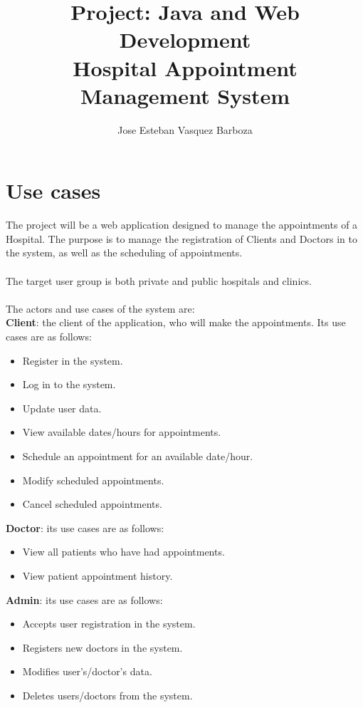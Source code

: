 \documentclass[11pt]{article}
\title{Project: Java and Web Development\\Hospital Appointment Management System}
\author{Jose Esteban Vasquez Barboza}
\begin{document}
    \maketitle

    \newpage

    \section{Use cases}

    The project will be a web application designed to manage the appointments of a Hospital. The purpose is to manage the registration of Clients and Doctors in to the system, as well as the scheduling of appointments.\\ \\
    The target user group is both private and public hospitals and clinics.\\ \\
    The actors and use cases of the system are: \\ 

\textbf{Client}: the client of the application, who will make the appointments. Its use cases are as follows:
    \begin{itemize}
        \item Register in the system.
        \item Log in to the system.
        \item Update user data.
        \item View available dates/hours for appointments.
        \item Schedule an appointment for an available date/hour.
        \item Modify scheduled appointments.
        \item Cancel scheduled appointments. \end{itemize}

\textbf{Doctor}:  its use cases are as follows:
    \begin{itemize}
        \item View all patients who have had appointments.
        \item View patient appointment history. \end{itemize}
    
\textbf{Admin}: its use cases are as follows:
    \begin{itemize}
        \item Accepts user registration in the system.
        \item Registers new doctors in the system.
        \item Modifies user's/doctor's data.
        \item Deletes users/doctors from the system.
    \end{itemize}
\end{document}
